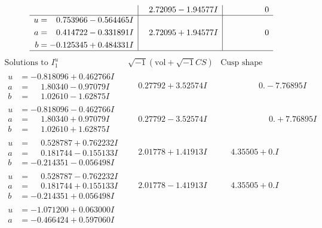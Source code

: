 \documentclass[1p]{elsarticle_modified}
\theoremstyle{definition}
\newcommand{\I}{\sqrt{-1}}
\begin{document}
$$\begin{array}{c|c|c}
 & \phantom{-}2.72095 - 1.94577 I & \phantom{-0.000000 } 0 \\ \hline\begin{aligned}
u &= \phantom{-}0.753966 - 0.564465 I \\
a &= \phantom{-}0.414722 - 0.331891 I \\
b &= -0.125345 + 0.484331 I\end{aligned}
 & \phantom{-}2.72095 + 1.94577 I & \phantom{-0.000000 } 0\\
 \hline 
 \end{array}$$\newpage$$\begin{array}{c|c|c}  
\text{Solutions to }I^u_{1}& \I (\text{vol} + \sqrt{-1}CS) & \text{Cusp shape}\\
 \hline 
\begin{aligned}
u &= -0.818096 + 0.462766 I \\
a &= \phantom{-}1.80340 - 0.97079 I \\
b &= \phantom{-}1.02610 - 1.62875 I\end{aligned}
 & \phantom{-}0.27792 + 3.52574 I & \phantom{-0.000000 } 0. - 7.76895 I \\ \hline\begin{aligned}
u &= -0.818096 - 0.462766 I \\
a &= \phantom{-}1.80340 + 0.97079 I \\
b &= \phantom{-}1.02610 + 1.62875 I\end{aligned}
 & \phantom{-}0.27792 - 3.52574 I & \phantom{-0.000000 -}0. + 7.76895 I \\ \hline\begin{aligned}
u &= \phantom{-}0.528787 + 0.762232 I \\
a &= \phantom{-}0.181744 - 0.155133 I \\
b &= -0.214351 - 0.056498 I\end{aligned}
 & \phantom{-}2.01778 + 1.41913 I & \phantom{-}4.35505 + 0. I\phantom{ +0.000000I} \\ \hline\begin{aligned}
u &= \phantom{-}0.528787 - 0.762232 I \\
a &= \phantom{-}0.181744 + 0.155133 I \\
b &= -0.214351 + 0.056498 I\end{aligned}
 & \phantom{-}2.01778 - 1.41913 I & \phantom{-}4.35505 + 0. I\phantom{ +0.000000I} \\ \hline\begin{aligned}
u &= -1.071200 + 0.063000 I \\
a &= -0.466424 + 0.597060 I \\

\end{aligned}
\end{array}$$
\end{document}
